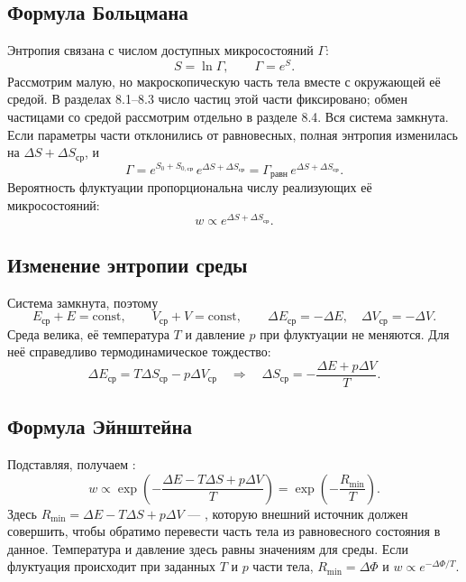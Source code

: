 \documentclass[../final.tex]{subfiles}
\begin{document}
\subsection{Формула Больцмана}
Энтропия связана с числом доступных микросостояний $\Gamma$:
\begin{equation*}
 S=\ln\Gamma,\qquad \Gamma=e^{S}.
\end{equation*}
Рассмотрим малую, но макроскопическую часть тела вместе с окружающей
её средой. В разделах 8.1--8.3 число частиц этой части фиксировано;
обмен частицами со средой рассмотрим отдельно в разделе 8.4.
Вся система замкнута. Если параметры части отклонились
от равновесных, полная энтропия изменилась на $\Delta S+\Delta S_{\text{ср}}$, и
\begin{equation*}
 \Gamma=e^{S_0+S_{0,\text{ср}}}\,e^{\Delta S+\Delta S_{\text{ср}}}
 =\Gamma_{\text{равн}}\,e^{\Delta S+\Delta S_{\text{ср}}}.
\end{equation*}
Вероятность флуктуации пропорциональна числу реализующих её микросостояний:
\begin{equation*}
 w\propto e^{\Delta S+\Delta S_{\text{ср}}}.
\end{equation*}

\subsection{Изменение энтропии среды}
Система замкнута, поэтому
\begin{equation*}
 E_{\text{ср}}+E=\mathrm{const},\qquad V_{\text{ср}}+V=\mathrm{const},
 \qquad \Delta E_{\text{ср}}=-\Delta E,\quad \Delta V_{\text{ср}}=-\Delta V.
\end{equation*}
Среда велика, её температура $T$ и давление $p$ при флуктуации не меняются.
Для неё справедливо термодинамическое тождество:
\begin{equation*}
 \Delta E_{\text{ср}}=T\Delta S_{\text{ср}}-p\Delta V_{\text{ср}}
 \quad\Longrightarrow\quad
 \Delta S_{\text{ср}}=-\frac{\Delta E+p\Delta V}{T}.
\end{equation*}

\subsection{Формула Эйнштейна}
Подставляя, получаем :
\begin{equation*}
 w\propto\exp\left(-\frac{\Delta E-T\Delta S+p\Delta V}{T}\right)
 =\exp\left(-\frac{R_{\min}}{T}\right).
\end{equation*}
Здесь $R_{\min}=\Delta E-T\Delta S+p\Delta V$ --- ,
которую внешний источник должен совершить, чтобы обратимо перевести часть
тела из равновесного состояния в данное. Температура и давление здесь
равны значениям для среды. Если флуктуация происходит при заданных $T$ и $p$
части тела, $R_{\min}=\Delta\Phi$ и $w\propto e^{-\Delta\Phi/T}$.
\end{document}

